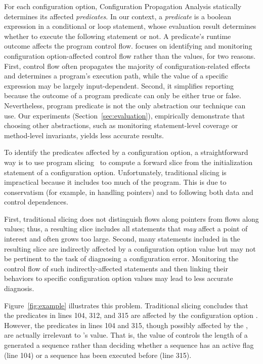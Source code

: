 For each configuration option, Configuration Propagation Analysis statically determines
its affected \textit{predicates}. In our context, a \textit{predicate}
is a boolean expression in a conditional or loop statement, whose evaluation result
determines whether to execute the following statement or not.
A predicate's runtime outcome affects the program control flow.
\ourtool focuses on identifying and monitoring 
configuration option-affected control flow
rather than the values, for two reasons. First, control flow 
often propagates the majority of configuration-related effects
and determines a program's execution path, while
the value of a specific expression may be largely input-dependent.
Second, it simplifies reporting because the outcome of a program predicate can only be
either true or false.  Nevertheless, program predicate is not the only
abstraction our technique can use. Our experiments (Section~\ref{sec:evaluation}),
empirically demonstrate that choosing other abstractions,
such as monitoring statement-level coverage
or method-level invariants, yields less accurate results.


To identify the predicates affected by a configuration option, a straightforward
way is to use program slicing~\cite{Horwitz:1988} to compute
a forward slice from the initialization statement of a
configuration option. Unfortunately, traditional slicing is impractical
because it includes too much of the program.  This is due to conservatism
(for example, in handling pointers) and to following both data and control
dependences.

First, traditional slicing does not distinguish flows along
pointers from flows along values; thus, a resulting slice includes all statements that
\textit{may} affect a point of interest and often grows too large. Second,
many statements included in the resulting slice are indirectly
affected by a configuration option value but may not be pertinent
to the task of diagnosing a configuration error.
Monitoring the control flow of such indirectly-affected statements 
and then linking their behaviors to specific configuration option values
may lead to less accurate diagnosis.

Figure~\ref{fig:example} illustrates
this problem.  Traditional slicing concludes that the predicates
in lines 104, 312, and 315 are affected by the configuration option .
However, the predicates in lines 104 and 315, though possibly
affected by the , are actually irrelevant
to 's value. That is, the value of 
controls the length of a generated a sequence rather
than deciding whether a sequence has an active flag (line 104) or
a sequence has been executed before (line 315).

